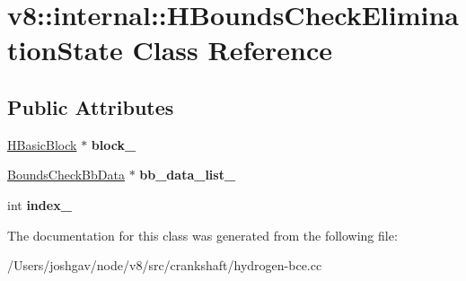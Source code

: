 \hypertarget{classv8_1_1internal_1_1_h_bounds_check_elimination_state}{}\section{v8\+:\+:internal\+:\+:H\+Bounds\+Check\+Elimination\+State Class Reference}
\label{classv8_1_1internal_1_1_h_bounds_check_elimination_state}
\subsection*{Public Attributes}
\begin{DoxyCompactItemize}
\item 
\hyperlink{classv8_1_1internal_1_1_h_basic_block}{H\+Basic\+Block} $\ast$ {\bfseries block\+\_\+}\hypertarget{classv8_1_1internal_1_1_h_bounds_check_elimination_state_a2e68854ceaa4e9812605c1156212e604}{}\label{classv8_1_1internal_1_1_h_bounds_check_elimination_state_a2e68854ceaa4e9812605c1156212e604}

\item 
\hyperlink{classv8_1_1internal_1_1_bounds_check_bb_data}{Bounds\+Check\+Bb\+Data} $\ast$ {\bfseries bb\+\_\+data\+\_\+list\+\_\+}\hypertarget{classv8_1_1internal_1_1_h_bounds_check_elimination_state_a634f9f88e7c3338108a8f7eff86b92a1}{}\label{classv8_1_1internal_1_1_h_bounds_check_elimination_state_a634f9f88e7c3338108a8f7eff86b92a1}

\item 
int {\bfseries index\+\_\+}\hypertarget{classv8_1_1internal_1_1_h_bounds_check_elimination_state_af41f43d7f7013f9cf7158bdc865eebb1}{}\label{classv8_1_1internal_1_1_h_bounds_check_elimination_state_af41f43d7f7013f9cf7158bdc865eebb1}

\end{DoxyCompactItemize}


The documentation for this class was generated from the following file\+:\begin{DoxyCompactItemize}
\item 
/\+Users/joshgav/node/v8/src/crankshaft/hydrogen-\/bce.\+cc\end{DoxyCompactItemize}
